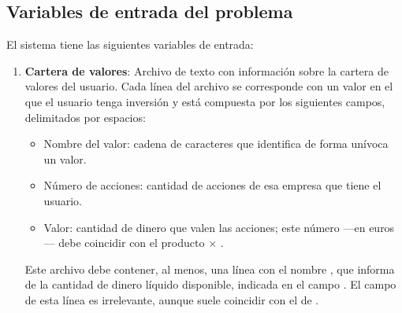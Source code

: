 \documentclass[a4paper, 11pt, titlepage]{article}
\begin{document}
    \subsection{Variables de entrada del problema}
    \label{ch:varEntrada}

    El sistema tiene las siguientes variables de entrada:

    \begin{enumerate}
        \item \textbf{Cartera de valores}: Archivo de texto con información sobre la cartera de valores del usuario. Cada línea del archivo se corresponde con un valor en el que el usuario tenga inversión y está compuesta por los siguientes campos, delimitados por espacios:
        \begin{itemize}
            \item Nombre del valor: cadena de caracteres que identifica de forma unívoca un valor.
            \item Número de acciones: cantidad de acciones de esa empresa que tiene el usuario.
            \item Valor: cantidad de dinero que valen las acciones; este número ---en euros--- debe coincidir con el producto  $\times$ .
        \end{itemize}
        Este archivo debe contener, al menos, una línea con el nombre , que informa de la cantidad de dinero líquido disponible, indicada en el campo . El campo  de esta línea es irrelevante, aunque suele coincidir con el de .


\end{enumerate}
\end{document}
